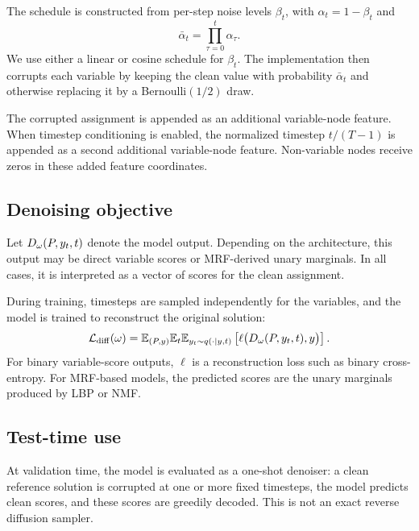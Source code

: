 The schedule is constructed from per-step noise levels $\beta_t$, with $\alpha_t=1-\beta_t$ and
\begin{equation}
    \bar{\alpha}_t = \prod_{\tau=0}^t \alpha_\tau .
\end{equation}
We use either a linear or cosine schedule for $\beta_t$. The implementation then corrupts each variable by keeping the clean value with probability $\bar{\alpha}_t$ and otherwise replacing it by a Bernoulli$(1/2)$ draw.

The corrupted assignment is appended as an additional variable-node feature. When timestep conditioning is enabled, the normalized timestep $t/(T-1)$ is appended as a second additional variable-node feature. Non-variable nodes receive zeros in these added feature coordinates.

\subsection{Denoising objective}
\label{subsec:diffusion_denoising_objective}

Let $D_\omega(P,y_t,t)$ denote the model output. Depending on the architecture, this output may be direct variable scores or MRF-derived unary marginals. In all cases, it is interpreted as a vector of scores for the clean assignment.

During training, timesteps are sampled independently for the variables, and the model is trained to reconstruct the original solution:
\begin{equation}
    \mathcal{L}_{\mathrm{diff}}(\omega)
    =
    \mathbb{E}_{(P,y)}
    \mathbb{E}_{t}
    \mathbb{E}_{y_t\sim q(\cdot\mid y,t)}
    \left[
        \ell\bigl(D_\omega(P,y_t,t),y\bigr)
    \right].
    \label{eq:diffusion_denoising_loss}
\end{equation}
For binary variable-score outputs, $\ell$ is a reconstruction loss such as binary cross-entropy. For MRF-based models, the predicted scores are the unary marginals produced by LBP or NMF.

\subsection{Test-time use}
\label{subsec:diffusion_test_time_use}

At validation time, the model is evaluated as a one-shot denoiser: a clean reference solution is corrupted at one or more fixed timesteps, the model predicts clean scores, and these scores are greedily decoded. This is not an exact reverse diffusion sampler.

